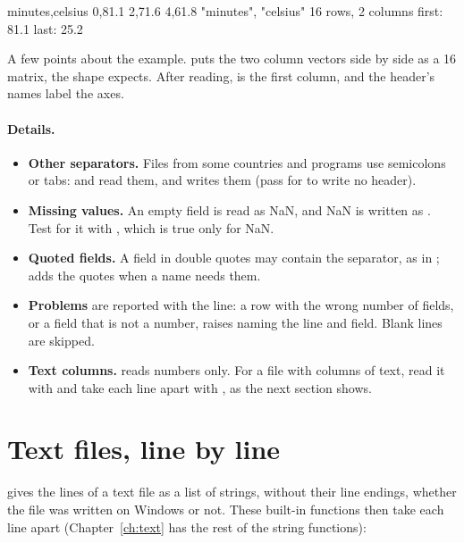 \documentclass[11pt,a4paper,openany]{report}
\begin{document}
{{
\begin{axonout}
minutes,celsius
0,81.1
2,71.6
4,61.8
{"minutes", "celsius"}
16 rows, 2 columns
first: 81.1 last: 25.2
\end{axonout}


A few points about the example. \code{[t, temp]} puts the two column vectors
side by side as a 16 matrix, the shape  expects.
After reading,  is the first column, and the header's
names label the axes.

\paragraph{Details.}
\begin{itemize}
\item \textbf{Other separators.} Files from some countries and programs use
  semicolons or tabs:  and
   read them, and
   writes them (pass 
  for  to write no header).
\item \textbf{Missing values.} An empty field is read as NaN, and NaN is
  written as . Test for it with , which is true only for
  NaN.
\item \textbf{Quoted fields.} A field in double quotes may contain the
  separator, as in ;  adds the quotes when a
  name needs them.
\item \textbf{Problems} are reported with the line: a row with the wrong number
  of fields, or a field that is not a number, raises  naming the
  line and field. Blank lines are skipped.
\item \textbf{Text columns.}  reads numbers only. For a file
  with columns of text, read it with  and take each line
  apart with , as the next section shows.
\end{itemize}

\section{Text files, line by line}

 gives the lines of a text file as a list of
strings, without their line endings, whether the file was written on Windows
or not. These built-in functions then take each line apart
(Chapter~\ref{ch:text} has the rest of the string functions):

}}
\end{document}

